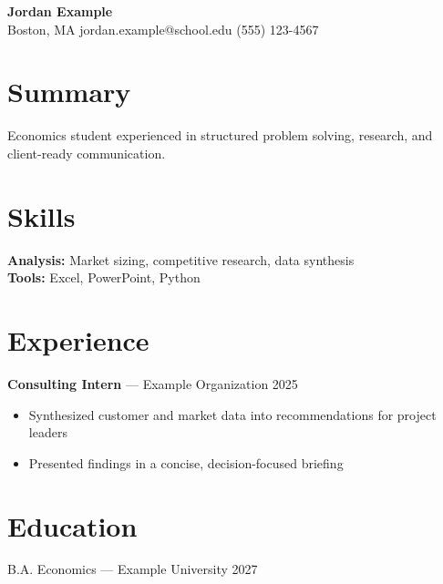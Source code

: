 \documentclass[11pt]{article}
\begin{document}
\begin{center}
{\LARGE \textbf{Jordan Example}} \\
Boston, MA \quad jordan.example@school.edu \quad (555) 123-4567
\end{center}

\section*{Summary}
Economics student experienced in structured problem solving, research, and client-ready communication.

\section*{Skills}
\textbf{Analysis:} Market sizing, competitive research, data synthesis \\
\textbf{Tools:} Excel, PowerPoint, Python

\section*{Experience}
\textbf{Consulting Intern} --- Example Organization \hfill 2025 \\
\begin{itemize}[nosep]
  \item Synthesized customer and market data into recommendations for project leaders
  \item Presented findings in a concise, decision-focused briefing
\end{itemize}

\section*{Education}
B.A. Economics --- Example University \hfill 2027
\end{document}
